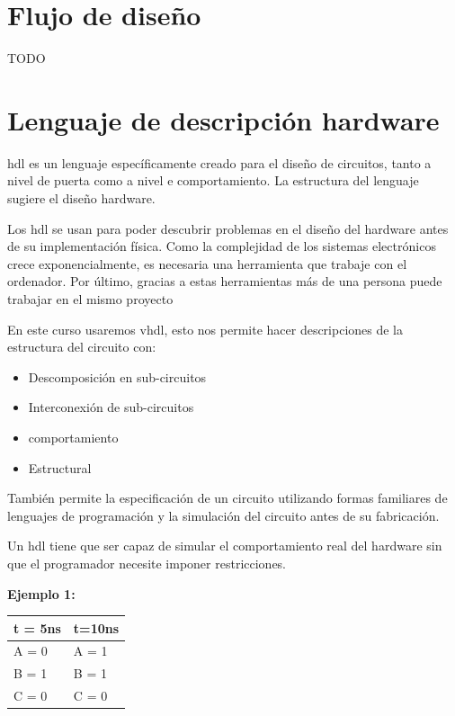 \pagestyle{fancy}
\section{Flujo de diseño}

TODO

\section{Lenguaje de descripción hardware}
\gls{hdl} es un lenguaje específicamente creado para el diseño de circuitos, tanto a nivel de puerta como a nivel e comportamiento. La estructura del lenguaje sugiere el diseño hardware.

Los \gls{hdl} se usan para poder descubrir problemas en el diseño del hardware antes de su implementación física. Como la complejidad de los sistemas electrónicos crece exponencialmente, es necesaria una herramienta que trabaje con el ordenador. Por último, gracias a estas herramientas más de una persona puede trabajar en el mismo proyecto

En este curso usaremos \gls{vhdl}, esto nos permite hacer descripciones de la estructura del circuito con:
\begin{itemize}
	\item Descomposición en sub-circuitos
	\item Interconexión de sub-circuitos
	\item comportamiento
	\item Estructural
\end{itemize}
También permite la especificación de un circuito utilizando formas familiares de lenguajes de programación y la simulación del circuito antes de su fabricación.

Un \gls{hdl} tiene que ser capaz de simular el comportamiento real del hardware sin que el programador necesite imponer restricciones.

\noindent \textbf{Ejemplo 1:}

\begin{table}[H]
	\centering
	\begin{tabular}{|l|l|}
		\hline
		\cellcolor[HTML]{70A9FC} t = 5ns & \cellcolor[HTML]{70A9FC} t=10ns \\ \hline
		A = 0                            & A = 1                           \\ \hline
		B = 1                            & B = 1                           \\ \hline
		C = 0                            & C = 0                           \\ \hline
	\end{tabular}
\end{table}

